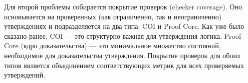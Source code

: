 Для второй проблемы собирается покрытие проверок (checker coverage). Оно основывается на проверенных (как ограниченно, так и неограниченно) утверждениях и подразделяется на два типа: COI и Proof Core. Как уже было сказано ранее, COI --- это структурно важная для утверждения логика. Proof Core (ядро доказательства) --- это минимальное множество состояний, необходимое для доказательства утверждения. Покрытие проверок для обоих типов является объединением соответствующих метрик для всех проверяемых утверждений. 








